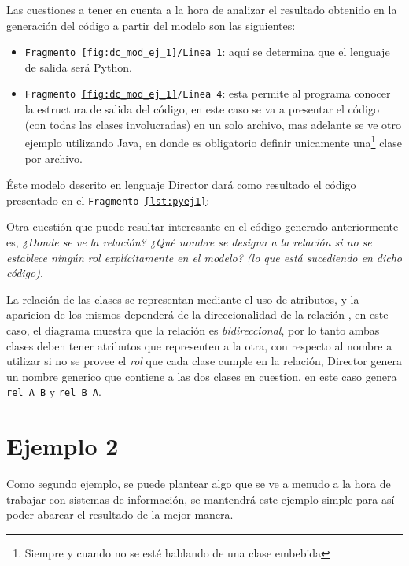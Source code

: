 Las cuestiones a tener en cuenta a la hora de analizar el resultado obtenido en
la generación del código a partir del modelo son las siguientes:
\begin{itemize}
	\item \texttt{Fragmento \ref{fig:dc_mod_ej_1}/Linea 1}: aquí se determina que
		el lenguaje de salida será Python.
	\item \texttt{Fragmento \ref{fig:dc_mod_ej_1}/Linea 4}: esta permite al
		programa conocer la estructura de salida del código, en este caso se va a
		presentar el código (con todas las clases involucradas) en un solo archivo,
		mas adelante se ve otro ejemplo utilizando Java, en donde es obligatorio
		definir unicamente una\footnote{Siempre y cuando no se esté hablando de una
		clase embebida} clase por archivo.
\end{itemize}

Éste modelo descrito en lenguaje Director dará como resultado el código
presentado en el \texttt{Fragmento \ref{lst:pyej1}}:



Otra cuestión que puede resultar interesante en el código generado
anteriormente es, \textit{¿Donde se ve la relación? ¿Qué nombre se designa a la
relación si no se establece ningún rol explícitamente en el modelo? (lo que
está sucediendo en dicho código)}.

La relación de las clases se representan mediante el uso de atributos, y la
aparicion de los mismos dependerá de la direccionalidad de la relación
\cites{seidl2012}{pooii2017}, en este caso, el diagrama muestra que la relación es
\textit{bidireccional}, por lo tanto ambas clases deben tener atributos que
representen a la otra, con respecto al nombre a utilizar si no se provee el
\textit{rol} que cada clase cumple en la relación, Director genera un nombre
generico que contiene a las dos clases en cuestion, en este caso genera
\texttt{rel\_A\_B} y \texttt{rel\_B\_A}.

\section{Ejemplo 2}
Como segundo ejemplo, se puede plantear algo que se ve a menudo a la hora de
trabajar con sistemas de información, se mantendrá este ejemplo simple para así
poder abarcar el resultado de la mejor manera.

